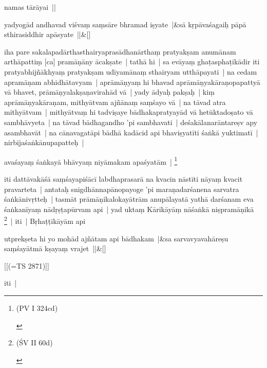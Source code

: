 \documentclass[article,12pt,a4paper]{memoir}
\begin{document}
	  \pstart namas tārāyai ||
	\pend
      
	    
	    \stanza[\smallbreak]
	yadyogād andhavad viśvaṃ saṃsāre bhramad iṣyate |&sā kṛpāvaśagaiḥ pāpā sthirasiddhir apāsyate ||\&[\smallbreak]


	

	  \pstart iha pare sakalapadārthasthairyaprasādhanārthaṃ pratyakṣam anumānam arthāpattiṃ [ca] pramāṇāny ācakṣate | \label{thakur75-112.7} tathā hi | sa evāyaṃ ghaṭasphaṭikādir iti pratyabhijñākhyaṃ pratyakṣam udīyamānaṃ sthairyam utthāpayati | na cedam apramāṇam abhidhātavyam | aprāmāṇyaṃ hi bhavad aprāmāṇyakāraṇopapattyā vā bhavet, prāmāṇyalakṣaṇavirahād vā | \label{thakur75-112.9} yady ādyaḥ pakṣaḥ | kiṃ aprāmāṇyakāraṇam, mithyātvam ajñānaṃ saṃśayo vā | \label{thakur75-112.10} na tāvad atra mithyātvam | mithyātvaṃ hi tadviṣaye bādhakapratyayād vā hetūktadoṣato vā sambhāvyeta | \label{thakur75-112.11} na tāvad bādhagandho 'pi sambhavati | deśakālanarāntareṣv apy asambhavāt | na cānavagatāpi bādhā kadācid api bhaviṣyatīti śaṅkā yuktimatī | nirbījaśaṅkānupapatteḥ |
	\pend
      

	  \pstart avaśayaṃ śaṅkayā bhāvyaṃ niyāmakam apaśyatām | \footnote{\begin{english}(PV I 324cd)\end{english}}
	\pend
      

	  \pstart iti dattāvakāśā saṃśayapiśācī labdhaprasarā na kvacin nāstīti nāyaṃ kvacit pravarteta | antataḥ snigdhānnapānopayoge 'pi maraṇadarśanena sarvatra śaṅkānivṛtteḥ | tasmāt prāmāṇikalokayātrām anupālayatā yathā darśanam eva śaṅkanīyaṃ nādṛṣṭapūrvam api | \label{thakur75-112.18} yad uktaṃ Kārikāyāṃ nāśaṅkā niṣpramāṇikā \footnote{\begin{english}(ŚV II 60d)\end{english}} | iti | Bṛhaṭṭīkāyām api
	\pend
      
	    
	    \stanza[\smallbreak]
	utprekṣeta hi yo mohād ajñātam api bādhakam |&sa sarvavyavahāreṣu saṃśayātmā kṣayaṃ vrajet ||\&[\smallbreak]


	[[(=TS 2871)]]

	  \pstart iti |
	\pend
      
\end{document}
